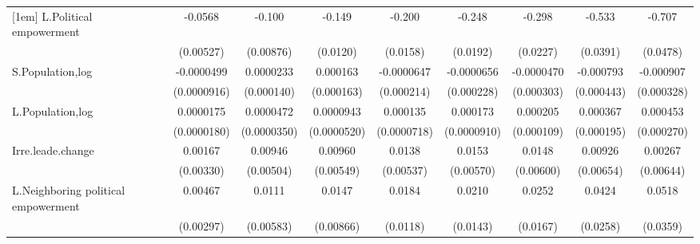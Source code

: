 \begin{table}[htbp]
\begin{tabular}{l*{9}{c}}
[1em]
L.Political empowerment&                     &     -0.0568\sym{***}&      -0.100\sym{***}&      -0.149\sym{***}&      -0.200\sym{***}&      -0.248\sym{***}&      -0.298\sym{***}&      -0.533\sym{***}&      -0.707\sym{***}\\
                    &                     &   (0.00527)         &   (0.00876)         &    (0.0120)         &    (0.0158)         &    (0.0192)         &    (0.0227)         &    (0.0391)         &    (0.0478)         \\
[1em]
S.Population,log    &                     &  -0.0000499         &   0.0000233         &    0.000163         &  -0.0000647         &  -0.0000656         &  -0.0000470         &   -0.000793\sym{*}  &   -0.000907\sym{***}\\
                    &                     & (0.0000916)         &  (0.000140)         &  (0.000163)         &  (0.000214)         &  (0.000228)         &  (0.000303)         &  (0.000443)         &  (0.000328)         \\
[1em]
L.Population,log    &                     &   0.0000175         &   0.0000472         &   0.0000943\sym{*}  &    0.000135\sym{*}  &    0.000173\sym{*}  &    0.000205\sym{*}  &    0.000367\sym{*}  &    0.000453\sym{*}  \\
                    &                     & (0.0000180)         & (0.0000350)         & (0.0000520)         & (0.0000718)         & (0.0000910)         &  (0.000109)         &  (0.000195)         &  (0.000270)         \\
[1em]
Irre.leade.change   &                     &     0.00167         &     0.00946\sym{*}  &     0.00960\sym{*}  &      0.0138\sym{**} &      0.0153\sym{***}&      0.0148\sym{**} &     0.00926         &     0.00267         \\
                    &                     &   (0.00330)         &   (0.00504)         &   (0.00549)         &   (0.00537)         &   (0.00570)         &   (0.00600)         &   (0.00654)         &   (0.00644)         \\
[1em]
L.Neighboring political empowerment&                     &     0.00467         &      0.0111\sym{*}  &      0.0147\sym{*}  &      0.0184         &      0.0210         &      0.0252         &      0.0424         &      0.0518         \\
                    &                     &   (0.00297)         &   (0.00583)         &   (0.00866)         &    (0.0118)         &    (0.0143)         &    (0.0167)         &    (0.0258)         &    (0.0359)         \\

\end{tabular}
\end{table}
